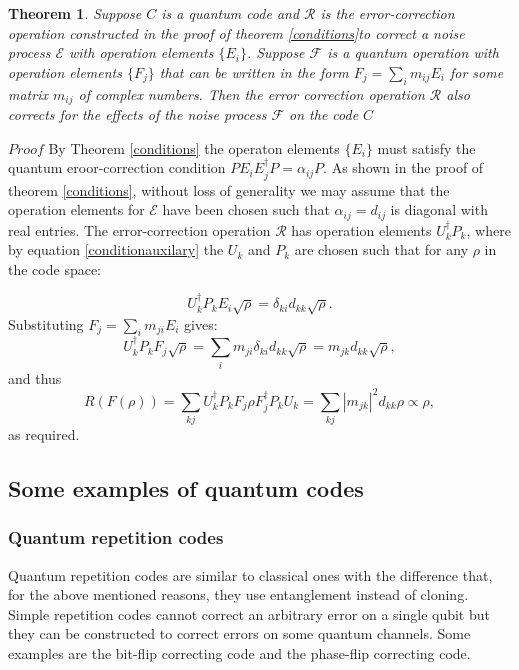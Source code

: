 \documentclass{article}
\newtheorem{theorem}{Theorem}
\begin{document}
\begin{theorem}
	Suppose $C$ is a quantum code and $\mathcal{R}$ is the error-correction operation
	constructed in the proof of theorem \ref{conditions}to correct a
	noise process $\mathcal{E}$ with operation elements $\{E_i\}$.
	Suppose $\mathcal{F}$ is a quantum operation with operation elements $\{F_j\}$
	that can be written in the form $F_j = \sum_i m_{ij} E_i$ for some matrix $m_{ij}$
	of complex numbers.
	Then the error correction operation $\mathcal{R}$ also corrects for the effects
	of the noise process $\mathcal{F}$ on the code $C$
\end{theorem}


\noindent $Proof$
By Theorem \ref{conditions} the operaton elements
$\{E_i\}$ must satisfy the quantum eroor-correction condition $PE_iE_j^\dag P = \alpha_{ij}P$.
As shown in the proof of theorem \ref{conditions},
without loss of generality we may assume that the operation elements for $\mathcal{E}$
have been chosen such that $\alpha_{ij} = d_{ij}$ is diagonal with real entries.
The error-correction operation $\mathcal{R}$ has operation elements $U_k^\dagger P_k$, where by equation
\ref{conditionauxilary} the $U_k$ and $P_k$ are chosen such that for any $\rho$ in
the code space:

\begin{equation}
	U_k^\dagger P_k E_i \sqrt{\rho} = \delta_{ki} d_{kk} \sqrt{\rho}.
\end{equation}
Substituting $F_j = \sum_i m_{ji} E_i$ gives:
\begin{equation}
	U_k^\dagger P_k F_j \sqrt{\rho} = \sum_i m_{ji} \delta_{ki} d_{kk} \sqrt{\rho} = m_{jk} d_{kk} \sqrt{\rho},
\end{equation}
and thus
\begin{equation}
	R(F(\rho)) = \sum_{kj} U_k^\dagger P_k F_j \rho F_j^\dagger P_k U_k = \sum_{kj} |m_{jk}|^2 d_{kk} \rho \propto \rho,
\end{equation}
as required.


\subsection{Some examples of quantum codes}

\subsubsection{Quantum repetition codes}

Quantum repetition codes are similar to classical ones with the difference that, for the
above mentioned reasons, they use entanglement instead of cloning.
Simple repetition codes cannot correct an arbitrary error on a single qubit but they can
be constructed to correct errors on some quantum channels.
Some examples are the bit-flip correcting code and the phase-flip correcting code.
\end{document}
